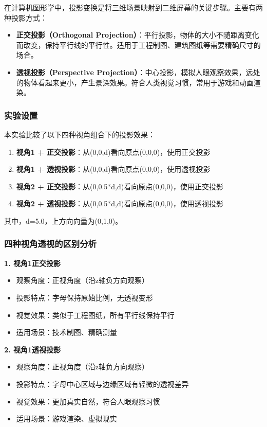 \documentclass[a4paper]{article}
\begin{document}
在计算机图形学中，投影变换是将三维场景映射到二维屏幕的关键步骤。主要有两种投影方式：

\begin{itemize}
    \item \textbf{正交投影（Orthogonal Projection）}：平行投影，物体的大小不随距离变化而改变，保持平行线的平行性。适用于工程制图、建筑图纸等需要精确尺寸的场合。
    
    \item \textbf{透视投影（Perspective Projection）}：中心投影，模拟人眼观察效果，远处的物体看起来更小，产生景深效果。符合人类视觉习惯，常用于游戏和动画渲染。
\end{itemize}

\subsubsection{实验设置}

本实验比较了以下四种视角组合下的投影效果：

\begin{enumerate}
    \item \textbf{视角1 + 正交投影}：从(0,0,d)看向原点(0,0,0)，使用正交投影
    \item \textbf{视角1 + 透视投影}：从(0,0,d)看向原点(0,0,0)，使用透视投影
    \item \textbf{视角2 + 正交投影}：从(0,0.5*d,d)看向原点(0,0,0)，使用正交投影
    \item \textbf{视角2 + 透视投影}：从(0,0.5*d,d)看向原点(0,0,0)，使用透视投影
\end{enumerate}

其中，d=5.0，上方向向量为(0,1,0)。

\subsubsection{四种视角透视的区别分析}

\textbf{1. 视角1正交投影}
\begin{itemize}
    \item 观察角度：正视角度（沿z轴负方向观察）
    \item 投影特点：字母保持原始比例，无透视变形
    \item 视觉效果：类似于工程图纸，所有平行线保持平行
    \item 适用场景：技术制图、精确测量
\end{itemize}

\textbf{2. 视角1透视投影}
\begin{itemize}
    \item 观察角度：正视角度（沿z轴负方向观察）
    \item 投影特点：字母中心区域与边缘区域有轻微的透视差异
    \item 视觉效果：更加真实自然，符合人眼观察习惯
    \item 适用场景：游戏渲染、虚拟现实
\end{itemize}
\end{document}

